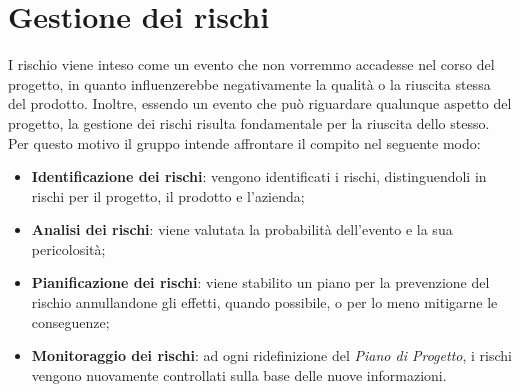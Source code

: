 \section{Gestione dei rischi}
I rischio viene inteso come un evento che non vorremmo accadesse nel corso del progetto, in quanto influenzerebbe negativamente la qualità o la riuscita stessa del prodotto. Inoltre, essendo un evento che può riguardare qualunque aspetto del progetto, la gestione dei rischi risulta fondamentale per la riuscita dello stesso. Per questo motivo il gruppo intende affrontare il compito nel seguente modo:\\
\begin{itemize}
\item \textbf{Identificazione dei rischi}: vengono identificati i rischi, distinguendoli in rischi per il progetto, il prodotto e l'azienda;
\item \textbf{Analisi dei rischi}: viene valutata la probabilità dell'evento e la sua pericolosità;
\item \textbf{Pianificazione dei rischi}: viene stabilito un piano per la prevenzione del rischio annullandone gli effetti, quando possibile, o per lo meno mitigarne le conseguenze;
\item \textbf{Monitoraggio dei rischi}: ad ogni ridefinizione del \textit{Piano di Progetto}, i rischi vengono nuovamente controllati sulla base delle nuove informazioni.
\end{itemize}

